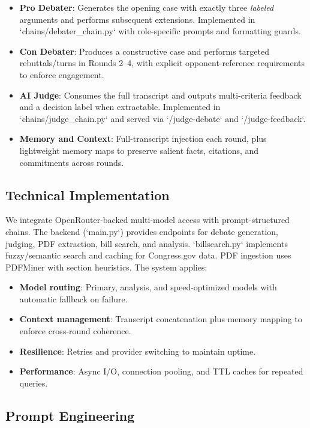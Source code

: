 \documentclass{article}
\begin{document}
\begin{itemize}
    \item \textbf{Pro Debater}: Generates the opening case with exactly three \emph{labeled} arguments and performs subsequent extensions. Implemented in `chains/debater\_chain.py` with role-specific prompts and formatting guards.
    \item \textbf{Con Debater}: Produces a constructive case and performs targeted rebuttals/turns in Rounds 2--4, with explicit opponent-reference requirements to enforce engagement.
    \item \textbf{AI Judge}: Consumes the full transcript and outputs multi-criteria feedback and a decision label when extractable. Implemented in `chains/judge\_chain.py` and served via `/judge-debate` and `/judge-feedback`.
    \item \textbf{Memory and Context}: Full-transcript injection each round, plus lightweight memory maps to preserve salient facts, citations, and commitments across rounds.
\end{itemize}

\subsection{Technical Implementation}

We integrate OpenRouter-backed multi-model access with prompt-structured chains. The backend (`main.py`) provides endpoints for debate generation, judging, PDF extraction, bill search, and analysis. `billsearch.py` implements fuzzy/semantic search and caching for Congress.gov data. PDF ingestion uses PDFMiner with section heuristics. The system applies:

\begin{itemize}
    \item \textbf{Model routing}: Primary, analysis, and speed-optimized models with automatic fallback on failure.
    \item \textbf{Context management}: Transcript concatenation plus memory mapping to enforce cross-round coherence.
    \item \textbf{Resilience}: Retries and provider switching to maintain uptime.
    \item \textbf{Performance}: Async I/O, connection pooling, and TTL caches for repeated queries.
\end{itemize}

\subsection{Prompt Engineering}
\end{document}
